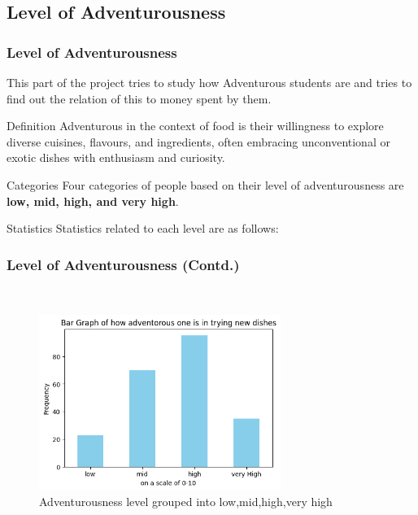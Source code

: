 \documentclass{beamer}
\begin{document}
\subsection{Level of Adventurousness}

\begin{frame}
    \frametitle{Level of Adventurousness}
    
    \begin{block}{}
    This part of the project tries to study how Adventurous students are and tries to find out the relation of this to money spent by them.
    \end{block}
    
    \begin{block}{Definition}
    Adventurous in the context of food is their willingness to explore diverse cuisines, flavours, and ingredients, often embracing unconventional or exotic dishes with enthusiasm and curiosity.
    \end{block}
    
    \begin{block}{Categories}
    Four categories of people based on their level of adventurousness are \textbf{low, mid, high, and very high}.
    \end{block}
    
    \begin{block}{Statistics}
    Statistics related to each level are as follows:
    \end{block}
    
\end{frame}


\begin{frame}
    \frametitle{Level of Adventurousness (Contd.) }\
    \begin{figure}
    \centering
    \includegraphics[width=0.7\textwidth]{output_58_0.png} %
    \caption{Adventurousness level grouped into low,mid,high,very high } %
    \label{fig:Percentage Distribution of Cuisine} %
    \end{figure}
\end{frame}
\end{document}
